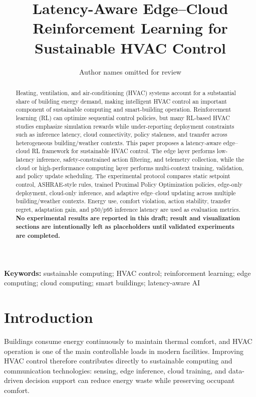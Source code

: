 \documentclass[11pt,a4paper]{article}
\title{Latency-Aware Edge--Cloud Reinforcement Learning for Sustainable HVAC Control}
\author{Author names omitted for review}
\date{}
\begin{document}
\maketitle

\begin{abstract}
Heating, ventilation, and air-conditioning (HVAC) systems account for a substantial share of building energy demand, making intelligent HVAC control an important component of sustainable computing and smart-building operation. Reinforcement learning (RL) can optimize sequential control policies, but many RL-based HVAC studies emphasize simulation rewards while under-reporting deployment constraints such as inference latency, cloud connectivity, policy staleness, and transfer across heterogeneous building/weather contexts. This paper proposes a latency-aware edge--cloud RL framework for sustainable HVAC control. The edge layer performs low-latency inference, safety-constrained action filtering, and telemetry collection, while the cloud or high-performance computing layer performs multi-context training, validation, and policy update scheduling. The experimental protocol compares static setpoint control, ASHRAE-style rules, trained Proximal Policy Optimization policies, edge-only deployment, cloud-only inference, and adaptive edge--cloud updating across multiple building/weather contexts. Energy use, comfort violation, action stability, transfer regret, adaptation gain, and p50/p95 inference latency are used as evaluation metrics. \textbf{No experimental results are reported in this draft; result and visualization sections are intentionally left as placeholders until validated experiments are completed.}
\end{abstract}

\textbf{Keywords:} sustainable computing; HVAC control; reinforcement learning; edge computing; cloud computing; smart buildings; latency-aware AI

\section{Introduction}

Buildings consume energy continuously to maintain thermal comfort, and HVAC operation is one of the main controllable loads in modern facilities. Improving HVAC control therefore contributes directly to sustainable computing and communication technologies: sensing, edge inference, cloud training, and data-driven decision support can reduce energy waste while preserving occupant comfort.
\end{document}
